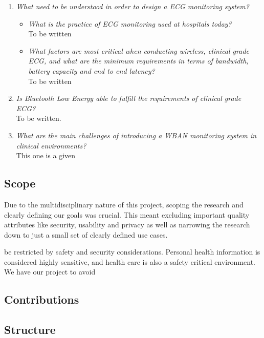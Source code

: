 \label{ssub:research_questions}
\begin{enumerate}
	
	\item \textit{What need to be understood in order to design a ECG monitoring system?}
	\begin{itemize}
    
		\item \textit{What is the practice of ECG monitoring used at hospitals today?}\\To be written
		
		\item \textit{What factors are most critical when conducting wireless, clinical grade ECG, and what are the minimum requirements in terms of bandwidth, battery capacity and end to end latency?}\\To be written
     
	\end{itemize}
	
	\item \textit{Is Bluetooth Low Energy able to fulfill the requirements of clinical grade ECG?}\\To be written.
	
  \item \textit{What are the main challenges of introducing a WBAN monitoring system in clinical environments?}\\This one is a given
  
\end{enumerate}

\subsection{Scope} 

\label{sub:scope}

Due to the multidisciplinary nature of this project, scoping the research and clearly defining our goals was crucial. This meant excluding important quality attributes like security, usability and privacy as well as narrowing the research down to just a small set of clearly defined use cases.

be restricted by safety and security considerations. Personal health information is considered highly sensitive, and health care is also a safety critical environment. We have our project to avoid 

\subsection{Contributions} 

\label{sub:contributions}

\subsection{Structure} 

\label{sub:structure}

